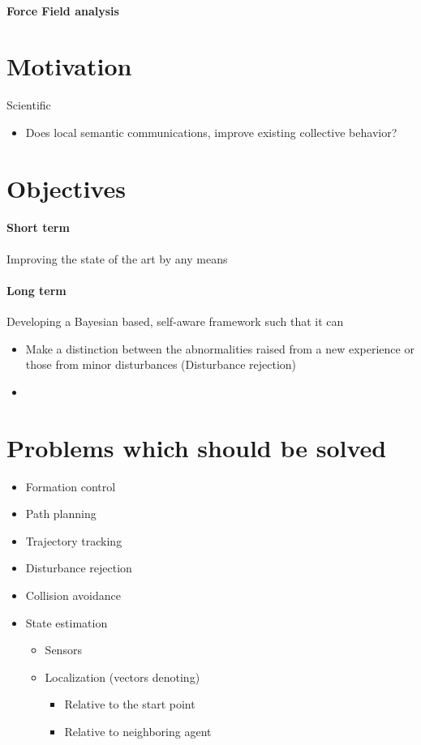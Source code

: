 \documentclass{article}
\begin{document}
		\paragraph{Force Field analysis}
	
	\section{Motivation}
		Scientific
		\begin{itemize}
			\item Does local semantic communications, improve existing collective behavior?
		\end{itemize}
	
	\section{Objectives}
		\paragraph{Short term}
			Improving the state of the art by any means
		\paragraph{Long term}
			Developing a Bayesian based, self-aware framework such that it  can
				\begin{itemize}
					\item Make a distinction between the abnormalities raised from a new experience or those from minor disturbances (Disturbance rejection)
					\item 
				\end{itemize}
			
	\section{Problems which should be solved}
		\begin{itemize}
			\item Formation control
			\item Path planning
			\item Trajectory tracking
			\item Disturbance rejection
			\item Collision avoidance
			\item State estimation
				\begin{itemize}
					\item Sensors
					\item Localization (vectors denoting)
						\begin{itemize}
							\item Relative to the start point
							\item Relative to neighboring agent
						\end{itemize}
				\end{itemize}
		\end{itemize}
	
\end{document}
